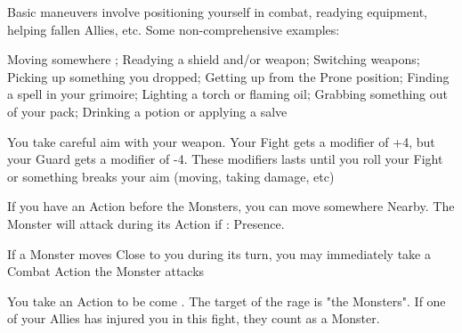 {  


  Basic maneuvers involve positioning yourself in combat, readying equipment, helping fallen Allies, etc.  Some non-comprehensive examples:

  Moving somewhere ;  Readying a shield and/or weapon; Switching weapons; Picking up something you dropped; Getting up from the Prone position; Finding a spell in your grimoire; Lighting a torch or flaming oil; Grabbing something out of your pack; Drinking a potion or applying a salve




  
  You take careful aim with your weapon. Your  Fight \RO gets a modifier of +4, but your Guard \RO gets a modifier of -4.  These modifiers lasts until you roll your Fight \RO or something breaks your aim (moving, taking damage, etc)

  If you have an Action before the Monsters, you can move somewhere Nearby.  The Monster will attack during its Action if \RS : Presence.

  If a Monster moves Close to you during its turn, you may immediately take a Combat Action  the Monster attacks

  You take an Action to be come .  The target of the rage is "the Monsters". If one of your Allies has injured you in this fight, they count as a Monster.


}

